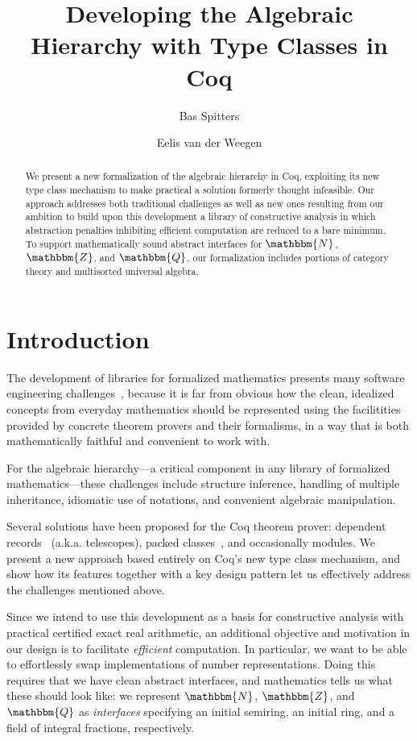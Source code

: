 \documentclass{llncs}
\newcommand{\N}{\ensuremath{\mathbbm{N}}}
\newcommand{\Z}{\ensuremath{\mathbbm{Z}}}
\newcommand{\Q}{\ensuremath{\mathbbm{Q}}}
\begin{document}
\title{Developing the Algebraic Hierarchy with Type Classes in Coq}
\author{Bas Spitters \and Eelis van der Weegen}
\maketitle
\begin{abstract}
We present a new formalization of the algebraic hierarchy in Coq, exploiting its new type class mechanism to make practical a solution formerly thought infeasible. Our approach addresses both traditional challenges as well as new ones resulting from our ambition to build upon this development a library of constructive analysis in which abstraction penalties inhibiting efficient computation are reduced to a bare minimum. To support mathematically sound abstract interfaces for $\N$, $\Z$, and $\Q$, our formalization includes portions of category theory and multisorted universal algebra.
\end{abstract}

\section{Introduction}
The development of libraries for formalized mathematics presents many software engineering challenges~\cite{C-corn,DBLP:conf/types/HaftmannW08}, because it is far from obvious how the clean, idealized concepts from everyday mathematics should be represented using the facilitities provided by concrete theorem provers and their formalisms, in a way that is both mathematically faithful and convenient to work with.

For the algebraic hierarchy---a critical component in any library of formalized mathematics---these challenges include structure inference, handling of multiple inheritance, idiomatic use of notations, and convenient algebraic manipulation.

Several solutions have been proposed for the Coq theorem prover: dependent records~\cite{DBLP:journals/jsc/GeuversPWZ02} (a.k.a. telescopes), packed classes~\cite{Packed}, and occasionally modules. We present a new approach based entirely on Coq's new type class mechanism, and show how its features together with a key design pattern let us effectively address the challenges mentioned above.

Since we intend to use this development as a basis for constructive analysis with practical certified exact real arithmetic, an additional objective and motivation in our design is to facilitate \emph{efficient} computation. In particular, we want to be able to effortlessly swap implementations of number representations. Doing this requires that we have clean abstract interfaces, and mathematics tells us what these should look like: we represent $\N$, $\Z$, and $\Q$ as \emph{interfaces} specifying an initial semiring, an initial ring, and a field of integral fractions, respectively.
\end{document}
